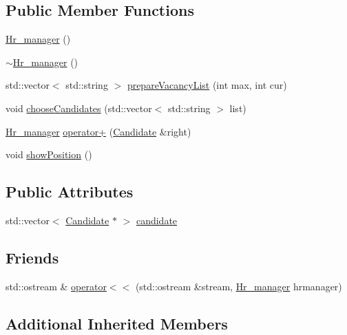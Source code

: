 \subsection*{Public Member Functions}
\begin{DoxyCompactItemize}
\item 
\hyperlink{class_hr__manager_a887008e77b1f49947fc52ace7b36212b}{Hr\+\_\+manager} ()
\item 
\hyperlink{class_hr__manager_a6713d753a80cf4346da53d52876e751f}{$\sim$\+Hr\+\_\+manager} ()
\item 
std\+::vector$<$ std\+::string $>$ \hyperlink{class_hr__manager_a579ebdb8579aace02b9c2d2f29051c77}{prepare\+Vacancy\+List} (int max, int cur)
\item 
void \hyperlink{class_hr__manager_ad172002747343f207758c2ea76d6e480}{choose\+Candidates} (std\+::vector$<$ std\+::string $>$ list)
\item 
\hyperlink{class_hr__manager}{Hr\+\_\+manager} \hyperlink{class_hr__manager_a3315b88815233ab95cd924280086d8a9}{operator+} (\hyperlink{class_candidate}{Candidate} \&right)
\item 
void \hyperlink{class_hr__manager_a760e884af11ec93a1dbf3769cdf34adf}{show\+Position} ()
\end{DoxyCompactItemize}
\subsection*{Public Attributes}
\begin{DoxyCompactItemize}
\item 
std\+::vector$<$ \hyperlink{class_candidate}{Candidate} $\ast$ $>$ \hyperlink{class_hr__manager_a4f136a7a1ad3c57b8463b3e627a5c5f5}{candidate}
\end{DoxyCompactItemize}
\subsection*{Friends}
\begin{DoxyCompactItemize}
\item 
std\+::ostream \& \hyperlink{class_hr__manager_a954d2b0eb5d6bd979593a3d4018f52c5}{operator$<$$<$} (std\+::ostream \&stream, \hyperlink{class_hr__manager}{Hr\+\_\+manager} hrmanager)
\end{DoxyCompactItemize}
\subsection*{Additional Inherited Members}


